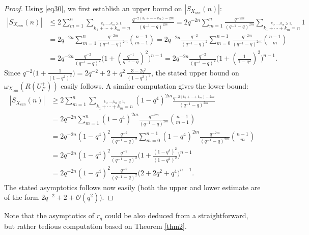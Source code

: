 \documentclass[11 pt, leqno]{amsart}
\newcommand{\mc}{\mathcal}
\theoremstyle{definition}
\numberwithin{equation}{section}
\begin{document}
\begin{proof}
	Using \eqref{eq30}, we first establish an upper bound on $|S_{X_{can}}(n)|$:
	\[\begin{split}
		|S_{X_{can}}(n)| &\le 
		2 \sum_{m=1}^{n} \sum_{\overset{k_1,\dotsc,k_m\ge 1,}{k_1+\cdots+k_m=n}} 
		\tfrac{ q^{-2(k_1+\cdots +k_m)-2m}}{(q^{-1}-q)^{2m}}=
		2 q^{-2n} \sum_{m=1}^{n} 
		\tfrac{ q^{-2m}}{(q^{-1}-q)^{2m}}
		\sum_{\overset{k_1,\dotsc,k_m\ge 1,}{k_1+\cdots+k_m=n}} 
		1\\
		&=
		2 q^{-2n} \sum_{m=1}^{n} 
		\tfrac{ q^{-2m}}{(q^{-1}-q)^{2m}}
		{n-1\choose m-1}=
		2 q^{-2n} 
		\tfrac{ q^{-2}}{(q^{-1}-q)^{2}}
		\sum_{m=0}^{n-1} 
		\tfrac{ q^{-2m}}{(q^{-1}-q)^{2m}}
		{n-1\choose m}\\
		&=
		2 q^{-2n} 
		\tfrac{ q^{-2}}{(q^{-1}-q)^{2}}
		\bigl( 1+ (\tfrac{q^{-1}}{q^{-1}-q})^{2} \bigr)^{n-1}=
		2 q^{-2n} 
		\tfrac{ q^{-2}}{(q^{-1}-q)^{2}}
		\bigl( 1+ (\tfrac{1}{1-q^2})^{2} \bigr)^{n-1}.
	\end{split}\]
Since $q^{-2} \bigl( 1+\tfrac{1}{(1-q^2)^2}\bigr)=2q^{-2}+2+q^2\, \tfrac{3-2q^2}{(1-q^2)^2}$,
the stated upper bound on $\omega_{X_{can}}(R(U_F^+))$ easily follows. A similar computation gives the lower bound:
	\[\begin{split}
		|S_{X_{can}}(n)| &\ge 
		2 \sum_{m=1}^{n} \sum_{\overset{k_1,\dotsc,k_m\ge 1,}{k_1+\cdots+k_m=n}} 
		(1-q^4)^{2m}
		\tfrac{ q^{-2(k_1+\cdots +k_m)-2m}}{(q^{-1}-q)^{2m}}\\
		&=
		2 q^{-2n} \sum_{m=1}^{n} 
		(1-q^4)^{2m}
		\tfrac{ q^{-2m}}{(q^{-1}-q)^{2m}}
		{n-1\choose m-1}\\
		&=
		2 q^{-2n}
		(1-q^4)^{2}
		\tfrac{ q^{-2}}{(q^{-1}-q)^{2}}
		\sum_{m=0}^{n-1} 
		(1-q^4)^{2m}
		\tfrac{ q^{-2m}}{(q^{-1}-q)^{2m}}
		{n-1\choose m}\\
		&=
		2 q^{-2n}
		(1-q^4)^{2}
		\tfrac{ q^{-2}}{(q^{-1}-q)^{2}}
		\bigl( 1 + 
		\tfrac{ (1-q^4)^{2}}{(1-q^{2})^{2}}
		\bigr)^{n-1}\\
		&=
		2 q^{-2n}
		(1-q^4)^{2}
		\tfrac{ q^{-2}}{(q^{-1}-q)^{2}}
		\bigl( 2+2q^2 +q^4 \bigr)^{n-1}.
	\end{split}\]
The stated asymptotics follows now easily (both the upper and lower estimate are of the form $2q^{-2} +2 + \mc{O}(q^2)$).
\end{proof}

Note that the asymptotics of $r_q$ could be also deduced from a straightforward, but rather tedious computation based on Theorem \ref{thm2}.
\end{document}
